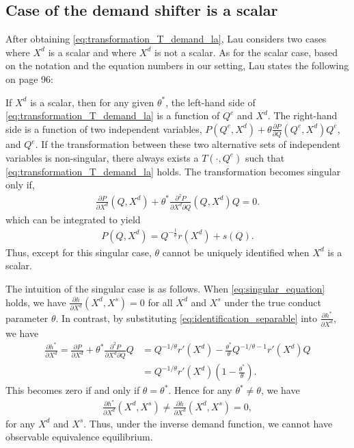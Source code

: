 \documentclass[11pt, a4paper]{article}
\theoremstyle{remark}
\begin{document}
\subsection{Case of the demand shifter is a scalar}\label{sec:case_x_d_scalar}
After obtaining \eqref{eq:transformation_T_demand_la}, Lau considers two cases where $X^{d}$ is a scalar and where $X^{d}$ is not a scalar.
As for the scalar case, based on the notation and the equation numbers in our setting, Lau states the following on page 96:
\begin{framed}
    If $X^{d}$ is a scalar, then for any given $\theta^*$, the left-hand side of \eqref{eq:transformation_T_demand_la} is a function of $Q^e$ and $X^{d}$.  
    The right-hand side is a function of two independent variables, $P(Q^e, X^{d}) + \theta \frac{\partial P}{\partial Q}(Q^e, X^{d}) Q^e,$ and $Q^e$.  
    If the transformation between these two alternative sets of independent variables is non-singular, there always exists a $T(\cdot, Q^e)$ such that \eqref{eq:transformation_T_demand_la} holds.
    The transformation becomes singular only if,
    \begin{align}
        \frac{\partial P}{\partial X^{d}}(Q, X^{d}) + \theta^{*} \frac{\partial^2 P}{\partial X^{d}\partial Q}(Q, X^{d})Q = 0. \label{eq:singular_equation}
    \end{align}
    which can be integrated to yield
    \begin{align}
        P(Q, X^{d}) = Q^{-\frac{1}{\theta}}r(X^{d}) + s(Q).
    \end{align}
    Thus, except for this singular case, $\theta$ cannot be uniquely identified when $X^{d}$ is a scalar.
\end{framed}
The intuition of the singular case is as follows.
When \eqref{eq:singular_equation} holds, we have $\frac{\partial h}{\partial X^{d}}(X^{d}, X^{s}) = 0$ for all $X^{d}$ and $X^{s}$ under the true conduct parameter $\theta$.
In contrast, by substituting \eqref{eq:identification_separable} into $\frac{\partial h^{*}}{\partial X^d}$, we have
\begin{align}
    \frac{\partial h^{*}}{\partial X^d} = \frac{\partial P}{\partial X^d} + \theta^{*} \frac{\partial^2 P}{\partial X^d\partial Q}Q  &= Q^{-1/\theta} r'(X^d) - \frac{\theta^{*}}{\theta} Q^{-1/\theta-1} r'(X^d) Q\\
    &= Q^{-1/\theta} r'(X^d) \left(1 - \frac{\theta^{*}}{\theta} \right).
\end{align}
This becomes zero if and only if $\theta= \theta^{*}$.
Hence for any $\theta^{*} \ne \theta$, we have
\begin{align}
    \frac{\partial h^{*}}{\partial X^{d}}(X^{d}, X^{s}) \ne \frac{\partial h}{\partial X^{d}}(X^{d}, X^{s}) = 0,
\end{align}
for any $X^{d}$ and $X^{s}$.
Thus, under the inverse demand function, we cannot have observable equivalence equilibrium.
\end{document}
